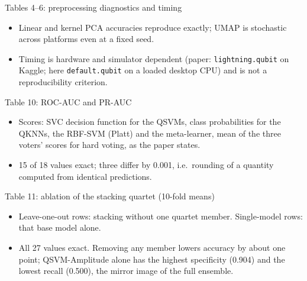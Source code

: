 \documentclass[aspectratio=169,10pt,t,xcolor={table}]{beamer}
\newcommand{\tabdir}{../reimplementation/tex/slides/}
\newcommand{\code}[1]{\texttt{\small #1}}
\begin{document}
\begin{frame}{Tables 4--6: preprocessing diagnostics and timing}
\begin{center}

\end{center}
\begin{itemize}\footnotesize
  \item Linear and kernel PCA accuracies reproduce exactly; UMAP is stochastic across platforms even at a fixed seed.
  \item Timing is hardware and simulator dependent (paper: \code{lightning.qubit} on Kaggle; here \code{default.qubit} on a loaded desktop CPU) and is not a reproducibility criterion.
\end{itemize}
\end{frame}

\begin{frame}{Table 10: ROC-AUC and PR-AUC}
\begin{center}

\end{center}
\begin{itemize}\footnotesize
  \item Scores: SVC decision function for the QSVMs, class probabilities for the QKNNs, the RBF-SVM (Platt) and the meta-learner, mean of the three voters' scores for hard voting, as the paper states.
  \item 15 of 18 values exact; three differ by 0.001, i.e.\ rounding of a quantity computed from identical predictions.
\end{itemize}
\end{frame}

\begin{frame}{Table 11: ablation of the stacking quartet (10-fold means)}
\begin{center}

\end{center}
\begin{itemize}\footnotesize
  \item Leave-one-out rows: stacking without one quartet member. Single-model rows: that base model alone.
  \item All 27 values exact. Removing any member lowers accuracy by about one point; QSVM-Amplitude alone has the highest specificity (0.904) and the lowest recall (0.500), the mirror image of the full ensemble.
\end{itemize}
\end{frame}
\end{document}
